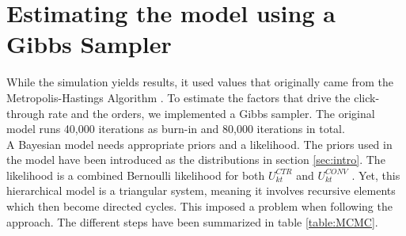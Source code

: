 \section{Estimating the model using a Gibbs Sampler} \label{sec:estimation}
While the simulation yields results, it used values that originally came from the Metropolis-Hastings Algorithm \citep[Appendix, p. 2]{agarwal_organic_2015}. To estimate the factors that drive the click-through rate and the orders, we implemented a Gibbs sampler. The original model runs 40,000 iterations as burn-in and 80,000 iterations in total.\\
A Bayesian model needs appropriate priors and a likelihood. The priors used in the model have been introduced as the distributions in section \ref{sec:intro}. The likelihood is a combined Bernoulli likelihood for both $U^{CTR}_{kt}$ and $U^{CONV}_{kt}$ \citep[Appendix, p. 2]{agarwal_organic_2015}. Yet, this hierarchical model is a triangular system, meaning it involves recursive elements which then become directed cycles. This imposed a problem when following the approach. The different steps have been summarized in table \ref{table:MCMC}.

